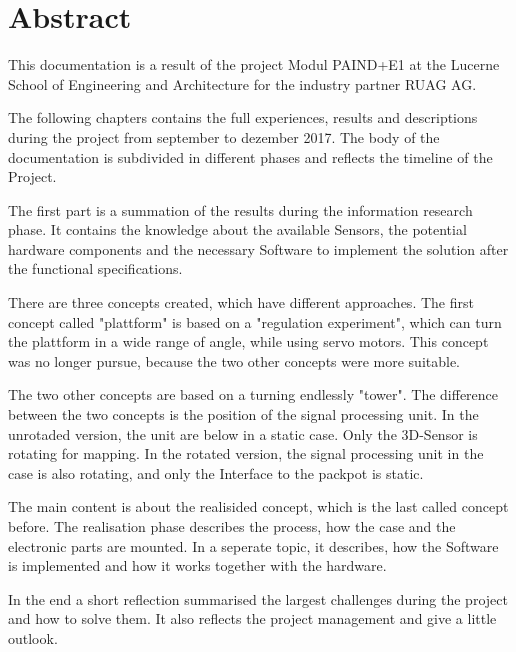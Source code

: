 \chapter*{Abstract}
\label{chap:Abstract}
This documentation is a result of the project Modul PAIND+E1 at the Lucerne School of Engineering and Architecture for the industry partner RUAG AG. 

The following chapters contains the full experiences, results and descriptions during the project from september to dezember 2017. The body of the documentation is subdivided in different phases and reflects the timeline of the Project. 

The first part is a summation of the results during the information research phase. It contains the knowledge about the available Sensors, the potential hardware components and the necessary Software to implement the solution after the functional specifications.  

There are three concepts created, which have different approaches. The first concept called "plattform" is based on a "regulation experiment", which can turn the plattform in a wide range of angle, while using servo motors. This concept was no longer pursue, because the two other concepts were more suitable.

The two other concepts are based on a turning endlessly "tower". The difference between the two concepts is the position of the signal processing unit. In the unrotaded version, the unit are below in a static case. Only the 3D-Sensor is rotating for mapping. In the rotated version, the signal processing unit in the case is also rotating, and only the Interface to the packpot is static. 

The main content is about the realisided concept, which is the last called concept before. The realisation phase describes the process, how the case and the electronic parts are mounted. In a seperate topic, it describes, how the Software is implemented and how it works together with the hardware. 

In the end a short reflection summarised the largest challenges during the project and how to solve them. It also reflects the project management and give a little outlook.



